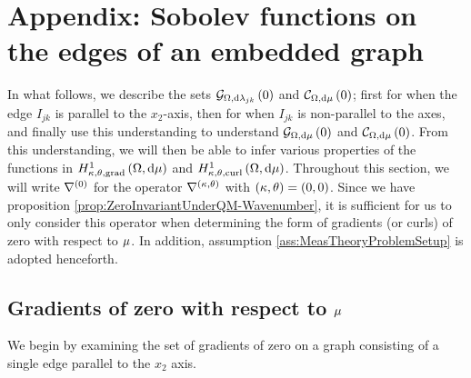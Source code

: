 \section{Appendix: Sobolev functions on the edges of an embedded graph} \label{app:3DMuAnalysis}
In what follows, we describe the sets $\mathcal{G}_{ \Omega, \mathrm{d}\lambda_{jk}}\left( 0 \right)$ and $\mathcal{C}_{ \Omega, \mathrm{d}\mu}\left( 0 \right)$; first for when the edge $I_{jk}$ is parallel to the $x_2$-axis, then for when $I_{jk}$ is non-parallel to the axes, and finally use this understanding to understand $\mathcal{G}_{ \Omega, \mathrm{d}\mu}\left( 0 \right)$ and $\mathcal{C}_{ \Omega, \mathrm{d}\mu}\left( 0 \right)$.
From this understanding, we will then be able to infer various properties of the functions in $H^1_{\kappa,\theta,\mathrm{grad}}\left( \Omega, \mathrm{d}\mu \right)$ and $H^1_{\kappa,\theta,\mathrm{curl}}\left( \Omega, \mathrm{d}\mu \right)$.
Throughout this section, we will write $\nabla^{(0)}$ for the operator $\nabla^{\left( \kappa, \theta \right)}$ with $\left( \kappa, \theta \right)=\left( 0,0 \right)$.
Since we have proposition \ref{prop:ZeroInvariantUnderQM-Wavenumber}, it is sufficient for us to only consider this operator when determining the form of gradients (or curls) of zero with respect to $\mu$.
In addition, assumption \ref{ass:MeasTheoryProblemSetup} is adopted henceforth.

\subsection{Gradients of zero with respect to $\mu$} \label{apps:3DGradientsOfZero}
We begin by examining the set of gradients of zero on a graph consisting of a single edge parallel to the $x_2$ axis.

